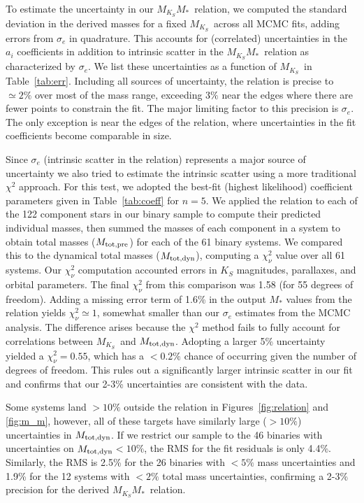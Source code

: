 \documentclass[twocolumn]{aastex62}
\newcommand{\mks}{$M_{K_S}$}
\newcommand{\mmk}{$M_{K_S}$\textendash$M_*$}
\newcommand{\order}{5}
\newcommand{\mpred}{$M_{\rm{tot,pre}}$}
\newcommand{\mdyn}{$M_{\rm{tot,dyn}}$}
\begin{document}
To estimate the uncertainty in our \mmk\ relation, we computed the standard deviation in the derived masses for a fixed \mks\ across all MCMC fits, adding errors from $\sigma_e$ in quadrature. This accounts for (correlated) uncertainties in the $a_i$ coefficients in addition to intrinsic scatter in the \mmk\ relation as characterized by $\sigma_e$. We list these uncertainties as a function of \mks\ in Table~\ref{tab:err}. Including all sources of uncertainty, the relation is precise to $\simeq2\%$ over most of the mass range, exceeding $3\%$ near the edges where there are fewer points to constrain the fit. The major limiting factor to this precision is $\sigma_e$. The only exception is near the edges of the relation, where uncertainties in the fit coefficients become comparable in size. 

Since $\sigma_e$ (intrinsic scatter in the relation) represents a major source of uncertainty we also tried to estimate the intrinsic scatter using a more traditional $\chi^2$ approach. For this test, we adopted the best-fit (highest likelihood) coefficient parameters given in Table~\ref{tab:coeff} for $n=\order$. We applied the relation to each of the 122 component stars in our binary sample to compute their predicted individual masses, then summed the masses of each component in a system to obtain total masses (\mpred) for each of the 61 binary systems. We compared this to the dynamical total masses (\mdyn), computing a $\chi^2_\nu$ value over all 61 systems. Our $\chi^2_\nu$ computation accounted errors in $K_S$ magnitudes, parallaxes, and orbital parameters. The final $\chi^2_\nu$ from this comparison was 1.58 (for 55 degrees of freedom). Adding a missing error term of 1.6\% in the output $M_*$ values from the relation yields $\chi^2_\nu \simeq 1$, somewhat smaller than our $\sigma_e$ estimates from the MCMC analysis. The difference arises because the $\chi^2$ method fails to fully account for correlations between \mks\ and \mdyn. Adopting a larger 5\% uncertainty yielded a $\chi^2_\nu=0.55$, which has a $<0.2\%$ chance of occurring given the number of degrees of freedom. This rules out a significantly larger intrinsic scatter in our fit and confirms that our 2-3\% uncertainties are consistent with the data. 

Some systems land $>10\%$ outside the relation in Figures~\ref{fig:relation} and \ref{fig:m_m}, however, all of these targets have similarly large ($>10\%$) uncertainties in \mdyn. If we restrict our sample to the 46 binaries with uncertainties on \mdyn$<10\%$, the RMS for the fit residuals is only 4.4\%. Similarly, the RMS is 2.5\% for the 26 binaries with $<5\%$ mass uncertainties and 1.9\% for the 12 systems with $<2\%$ total mass uncertainties, confirming a 2-3\% precision for the derived \mmk\ relation. 
\end{document}
